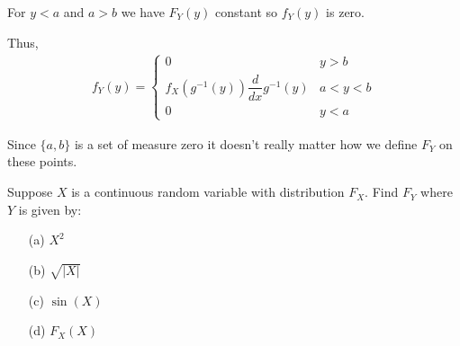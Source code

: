 \documentclass[10pt]{article}
\begin{document}
\begin{solution}[Solution]
\begin{enumerate}
        For \( y<a \) and \( a>b \) we have \( F_Y(y) \) constant so \( f_Y(y) \) is zero.

        Thus,
        \begin{align*}
            f_Y(y) = 
            \begin{cases}
                0 & y > b \\
                f_X(g^{-1}(y)) \dfrac{d}{dx}g^{-1}(y) & a<y<b \\
                0 & y <  a
            \end{cases}
        \end{align*}
        
        Since \( \{a,b\} \) is a set of measure zero it doesn't really matter how we define \( F_Y \) on these points. 

\end{enumerate}

\end{solution}

\begin{problem}[Exercise 1.5]
Suppose \( X \) is a continuous random variable with distribution \( F_X \). Find \( F_Y \) where \( Y \) is given by:
\begin{enumerate}
	\item[(a)] \( X^2 \)
	\item[(b)] \( \sqrt{|X|} \)
	\item[(c)] \( \sin(X) \)
	\item[(d)] \( F_X(X) \)
\end{enumerate}
\end{problem}
\end{document}
